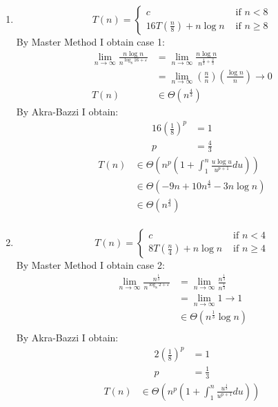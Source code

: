\documentclass[paper=a4,fontsize=11pt]{article}
\begin{document}
\begin{enumerate}
\item
\[
T(n) = \left\{
\begin{array}{cl}
c & \textrm{ if } n < 8\\
16T(\frac{n}{8}) + n\log{n} & \textrm{ if } n \geq 8
\end{array}
\right.
\]
By Master Method I obtain case 1:
\begin{align*}
\lim_{n\to\infty}{\frac{n\log{n}}{n^{\log_{8}{16}+\varepsilon}}}&=\lim_{n\to\infty}{\frac{n\log{n}}{n^{\frac{4}{3}+\frac{2}{3}}}}\\
&=\lim_{n\to\infty}{(\frac{n}{n})(\frac{\log{n}}{n})}\rightarrow0\\
T(n)&\in\Theta(n^{\frac{4}{3}})
\end{align*}
By Akra-Bazzi I obtain:\\
\begin{align*}
16(\frac{1}{8})^{p}&=1\\
p&=\frac{4}{3}
\end{align*}
\begin{align*}
T(n) &\in \Theta(n^{p}(1+\int_{1}^{n}{\frac{u\log{u}}{u^{p+1}}du}))\\
&\in \Theta(-9n+10n^{\frac{4}{3}}-3n\log{n})\\
&\in \Theta(n^{\frac{4}{3}})\\
\end{align*}
\item
\[
T(n) = \left\{
\begin{array}{cl}
c & \textrm{ if } n < 4\\
8T(\frac{n}{4}) + n\log n & \textrm{ if } n \geq 4
\end{array}
\right.
\]
By Master Method I obtain case 2:
\begin{align*}
    \lim_{n\to\infty}{\frac{n^{\frac{1}{3}}}{n^{\log_{8}{2}+\varepsilon}}}&=\lim_{n\to\infty}{\frac{n^{\frac{1}{3}}}{n^{\frac{1}{3}}}}\\
    &=\lim_{n\to\infty}{1}\rightarrow1\\
    &\in \Theta(n^{\frac{1}{3}}\log{n})\\
\end{align*}
By Akra-Bazzi I obtain:
\begin{align*}
    2(\frac{1}{8})^{p}&=1\\
    p&=\frac{1}{3}
\end{align*}
\begin{align*}
    T(n) &\in \Theta(n^{p}(1+\int_{1}^{n}{\frac{u^{\frac{1}{3}}}{u^{p+1}}du}))\\

\end{align*}
\end{enumerate}
\end{document}

